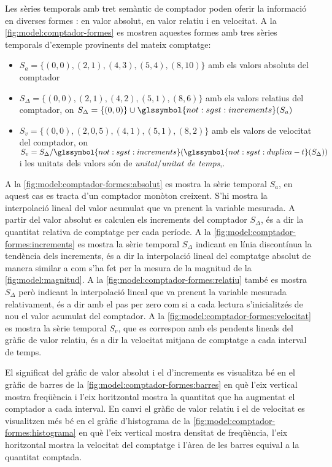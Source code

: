 Les sèries temporals amb tret semàntic de comptador poden oferir la
informació en diverses formes : en valor absolut, en valor relatiu i
en velocitat. A la \autoref{fig:model:comptador-formes} es mostren
aquestes formes amb tres sèries temporals d'exemple provinents del
mateix comptatge:

\begin{itemize}
\item $S_a = \{(0,0),(2,1),(4,3),(5,4),(8,10)\}$ amb els valors
  absoluts del comptador
\item $S_\Delta = \{(0,0),(2,1),(4,2),(5,1),(8,6)\}$ amb els valors
  relatius del comptador, on $S_\Delta = \{(0,0)\} \cup
  \glssymbol{not:sgst:increments}(S_a)$
\item $S_v = \{(0,0),(2,0{,}5),(4,1),(5,1),(8,2)\}$ amb els valors de
  velocitat del comptador, on $S_v = S_\Delta /
  \glssymbol{not:sgst:increments}(\glssymbol{not:sgst:duplica-t}(S_\Delta))$
  i les unitats dels valors són de \emph{unitat$/$unitat de temps},.
\end{itemize}



A la \autoref{fig:model:comptador-formes:absolut} es mostra la sèrie
temporal $S_a$, en aquest cas es tracta d'un comptador monòton
creixent. S'hi mostra la interpolació lineal del valor acumulat que va
prenent la variable mesurada.  A partir del valor absolut es calculen
els increments del comptador $S_\Delta$, és a dir la quantitat
relativa de comptatge per cada període.  A la
\autoref{fig:model:comptador-formes:increments} es mostra la sèrie
temporal $S_\Delta$ indicant en línia discontínua la tendència dels
increments, és a dir la interpolació lineal del comptatge absolut de
manera similar a com s'ha fet per la mesura de la magnitud de la
\autoref{fig:model:magnitud}.  A la
\autoref{fig:model:comptador-formes:relatiu} també es mostra
$S_\Delta$ però indicant la interpolació lineal que va prenent la
variable mesurada relativament, és a dir amb el pas per zero com si a
cada lectura s'inicialitzés de nou el valor acumulat del comptador. A
la \autoref{fig:model:comptador-formes:velocitat} es mostra la sèrie
temporal $S_v$, que es correspon amb els pendents lineals del
gràfic de valor relatiu, és a dir la velocitat mitjana de comptatge a
cada interval de temps.

El significat del gràfic de valor absolut i el d'increments es
visualitza bé en el gràfic de barres de la
\autoref{fig:model:comptador-formes:barres} en què l'eix vertical
mostra freqüència i l'eix horitzontal mostra la quantitat que
ha augmentat el comptador a cada interval. En canvi el gràfic de valor
relatiu i el de velocitat es visualitzen més bé en el gràfic
d'histograma de la \autoref{fig:model:comptador-formes:histograma} en
què l'eix vertical mostra densitat de freqüència, l'eix horitzontal 
mostra la velocitat del comptatge i l'àrea
de les barres equival a la quantitat comptada.



